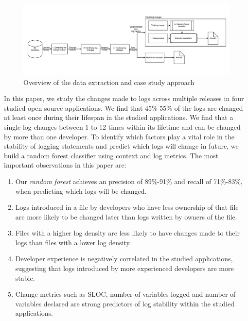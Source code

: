 \begin{figure}
	\centering
	\includegraphics[width=1\textwidth,
	height=.4\textwidth]{LogGenalogyMethdology}
	\caption{Overview of the data extraction and case study approach}
	\label{fig:LGmethod}
\end{figure}


In this paper, we study the changes made to logs across multiple releases in four studied open source applications. We find that 45\%-55\% of the logs are changed at least once during their lifespan in the studied applications. We find that a single log changes between 1 to 12 times within its lifetime and can be changed by more than one developer. To identify which factors play a vital role in the stability of logging statements and predict which logs will change in future, we build a random forest classifier using context and log metrics. The most important observations in this paper are:
\begin{enumerate}
	\item  Our \textsl{random forest} achieves an precision of 89\%-91\% and recall of 71\%-83\%, when predicting which logs will be changed.
	\item Logs introduced in a file by developers who have less ownership of that file are more likely to be changed later than logs written by owners of the file. 
	\item Files with a higher log density are less likely to have changes made to their logs than files with a lower log density.
	\item Developer experience is negatively correlated in the studied applications, suggesting that logs introduced by more experienced developers are more stable. 
	\item Change metrics such as SLOC, number of variables logged and number of variables declared are strong predictors of log stability within the studied applications. 

\end{enumerate}



